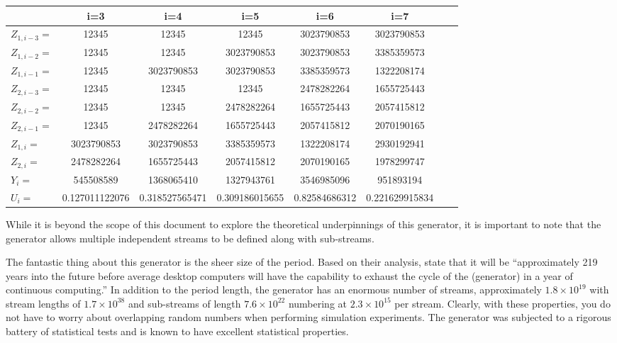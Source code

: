\documentclass[
]{book}
\theoremstyle{definition}
\theoremstyle{definition}
\theoremstyle{definition}
\theoremstyle{definition}
\theoremstyle{remark}
\begin{document}
\begin{longtable}[]{@{}lcccccll@{}}
\toprule
& i=3 & i=4 & i=5 & i=6 & i=7 & & \\
\midrule
\endhead
\(Z_{1,i-3}=\) & 12345 & 12345 & 12345 & 3023790853 & 3023790853 & & \\
\(Z_{1,i-2}=\) & 12345 & 12345 & 3023790853 & 3023790853 & 3385359573 & & \\
\(Z_{1,i-1}=\) & 12345 & 3023790853 & 3023790853 & 3385359573 & 1322208174 & & \\
\(Z_{2,i-3}=\) & 12345 & 12345 & 12345 & 2478282264 & 1655725443 & & \\
\(Z_{2,i-2}=\) & 12345 & 12345 & 2478282264 & 1655725443 & 2057415812 & & \\
\(Z_{2,i-1}=\) & 12345 & 2478282264 & 1655725443 & 2057415812 & 2070190165 & & \\
\(Z_{1,i}=\) & 3023790853 & 3023790853 & 3385359573 & 1322208174 & 2930192941 & & \\
\(Z_{2,i}=\) & 2478282264 & 1655725443 & 2057415812 & 2070190165 & 1978299747 & & \\
\(Y_i=\) & 545508589 & 1368065410 & 1327943761 & 3546985096 & 951893194 & & \\
\(U_i=\) & 0.127011122076 & 0.318527565471 & 0.309186015655 & 0.82584686312 & 0.221629915834 & & \\
\bottomrule
\end{longtable}

While it is beyond the scope of this document to explore the theoretical
underpinnings of this generator, it is important to note that the generator allows multiple independent streams to be defined along with sub-streams.

The fantastic thing about this generator is the sheer size of the
period. Based on their analysis, \citet{ecuyer2002an} state that it will be
``approximately 219 years into the future before average desktop
computers will have the capability to exhaust the cycle of the
(generator) in a year of continuous computing.'' In addition to the
period length, the generator has an enormous number of streams,
approximately \(1.8 \times 10^{19}\) with stream lengths of
\(1.7 \times 10^{38}\) and sub-streams of length \(7.6 \times 10^{22}\)
numbering at \(2.3 \times 10^{15}\) per stream. Clearly, with these
properties, you do not have to worry about overlapping random numbers
when performing simulation experiments. The generator was subjected to a
rigorous battery of statistical tests and is known to have excellent
statistical properties.
\end{document}
